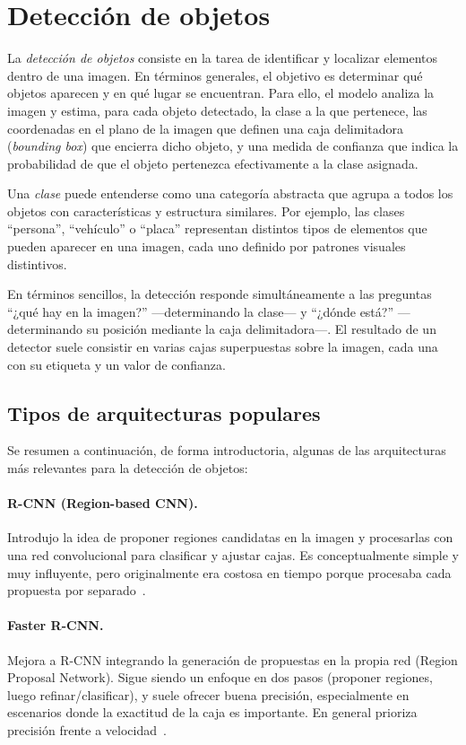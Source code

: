 \section{Detección de objetos}
La \emph{detección de objetos} consiste en la tarea de identificar y localizar elementos dentro de una imagen. 
En términos generales, el objetivo es determinar qué objetos aparecen y en qué lugar se encuentran. 
Para ello, el modelo analiza la imagen y estima, para cada objeto detectado, la clase a la que pertenece, 
las coordenadas en el plano de la imagen que definen una caja delimitadora (\emph{bounding box}) 
que encierra dicho objeto, y una medida de confianza que indica la probabilidad de que el objeto 
pertenezca efectivamente a la clase asignada.

Una \emph{clase} puede entenderse como una categoría abstracta que agrupa a todos los objetos 
con características y estructura similares. Por ejemplo, las clases ``persona'', ``vehículo'' o ``placa'' 
representan distintos tipos de elementos que pueden aparecer en una imagen, 
cada uno definido por patrones visuales distintivos.

En términos sencillos, la detección responde simultáneamente a las preguntas 
``¿qué hay en la imagen?'' ---determinando la clase--- y ``¿dónde está?''
---determinando su posición mediante la caja delimitadora---. 
El resultado de un detector suele consistir en varias cajas superpuestas sobre la imagen, 
cada una con su etiqueta y un valor de confianza. 

\subsection{Tipos de arquitecturas populares}
Se resumen a continuación, de forma introductoria, algunas de las arquitecturas más relevantes para la detección de objetos:

\paragraph{R-CNN (Region-based CNN).}
Introdujo la idea de proponer regiones candidatas en la imagen y procesarlas con una 
red convolucional para clasificar y ajustar cajas. 
Es conceptualmente simple y muy influyente,
pero originalmente era costosa en tiempo porque procesaba cada propuesta por separado~\cite{girshick2015fastrcnn}.

\paragraph{Faster R-CNN.}
Mejora a R-CNN integrando la generación de propuestas en la propia red (Region Proposal Network). 
Sigue siendo un enfoque en dos pasos (proponer regiones, luego refinar/clasificar),
y suele ofrecer buena precisión, especialmente en escenarios donde la exactitud de la caja es importante.
En general prioriza precisión frente a velocidad~\cite{NIPS2015_14bfa6bb}.

